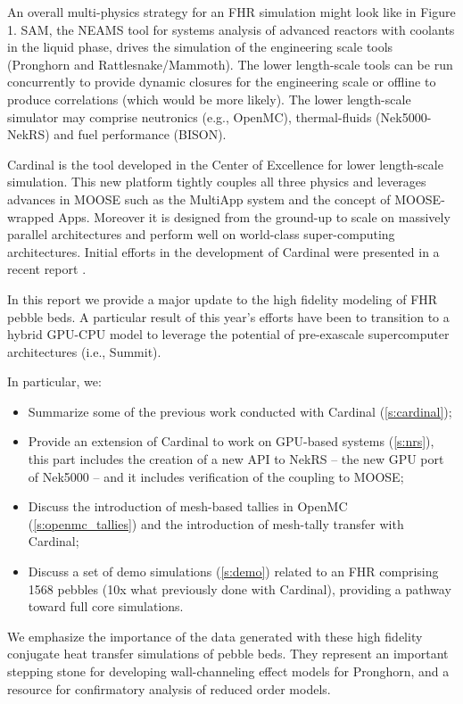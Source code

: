 An overall multi-physics strategy for an FHR simulation might look like in Figure 1.
SAM, the NEAMS tool for systems analysis of advanced reactors with coolants in the liquid phase, drives the simulation of the engineering scale tools (Pronghorn and Rattlesnake/Mammoth).
The lower length-scale tools can be run concurrently to provide dynamic closures for the engineering scale or offline to produce correlations (which would be more likely).
The lower length-scale simulator may comprise neutronics (e.g., OpenMC), thermal-fluids (Nek5000-NekRS) and fuel performance (BISON).

Cardinal is the tool developed in the Center of Excellence for lower length-scale simulation.
This new platform tightly couples all three physics and leverages advances in MOOSE \cite{gaston2009moose} such as the MultiApp system and the concept of MOOSE-wrapped Apps.
Moreover it is designed from the ground-up to scale on massively parallel architectures and perform well on world-class super-computing architectures.
Initial efforts in the development of Cardinal were presented in a recent report \cite{cardinal}.

In this report we provide a major update to the high fidelity modeling of FHR pebble beds.
A particular result of this year's efforts have been to transition to a hybrid GPU-CPU model to leverage the potential of pre-exascale supercomputer architectures (i.e., Summit).

In particular, we:
\begin{itemize}
\item Summarize some of the previous work conducted with Cardinal (\autoref{s:cardinal});
\item Provide an extension of Cardinal to work on GPU-based systems (\autoref{s:nrs}), this part includes the creation of a new API to NekRS \cite{toward}-- the new GPU port of Nek5000 -- and it includes  verification of the coupling to MOOSE;
\item Discuss the introduction of mesh-based tallies in OpenMC (\autoref{s:openmc_tallies}) and the introduction of mesh-tally transfer with Cardinal;
\item Discuss a set of demo simulations (\autoref{s:demo}) related to an FHR comprising 1568 pebbles (10x what previously done with Cardinal), providing a pathway toward full core simulations.
\end{itemize}

We emphasize the importance of the data generated with these high fidelity conjugate heat transfer simulations of pebble beds.
They represent an important stepping stone for developing wall-channeling effect models for Pronghorn, and a resource for confirmatory analysis of reduced order models.
